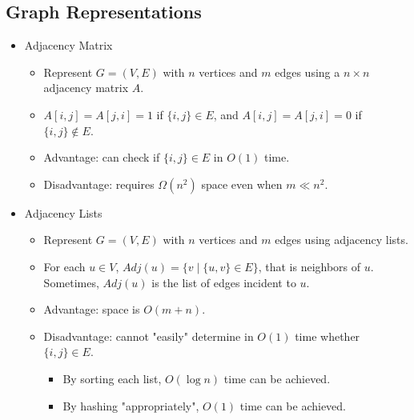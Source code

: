 \documentclass[12pt]{article}
\begin{document}
\subsection{Graph Representations}
\begin{itemize}
    \item Adjacency Matrix
    \begin{itemize}
        \item Represent $G = (V, E)$ with $n$ vertices and $m$ edges using a $n \times n$ adjacency matrix $A$.
        \item $A[i, j] = A[j, i] = 1$ if $\{ i , j \} \in E$, and $A[i, j] = A[j, i] = 0$ if $\{ i, j \} \notin E$.
        \item Advantage: can check if $\{ i, j \} \in E$ in $O(1)$ time.
        \item Disadvantage: requires $\Omega(n^2)$ space even when $m \ll n^2$.
    \end{itemize}
    \item Adjacency Lists
    \begin{itemize}
        \item Represent $G = (V, E)$ with $n$ vertices and $m$ edges using adjacency lists.
        \item For each $u \in V$, $Adj(u) = \{ v \mid \{ u, v \} \in E \}$, that is neighbors of $u$. Sometimes, $Adj(u)$ is the list of edges incident to $u$.
        \item Advantage: space is $O(m + n)$.
        \item Disadvantage: cannot "easily" determine in $O(1)$ time whether $\{ i, j \} \in E$.
        \begin{itemize}
            \item By sorting each list, $O(\log n)$ time can be achieved.
            \item By hashing "appropriately", $O(1)$ time can be achieved.
        \end{itemize}
    \end{itemize}
\end{itemize}
\end{document}
